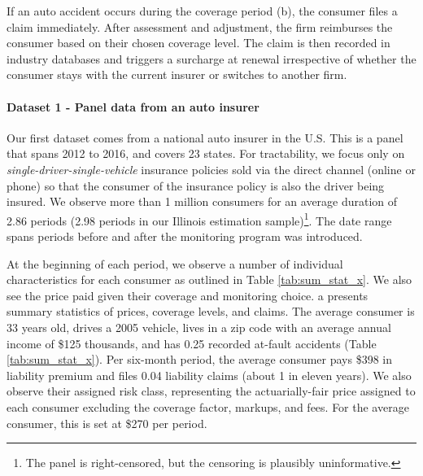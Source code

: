 If an auto accident occurs during the coverage period (b), the consumer files a claim immediately. After assessment and adjustment, the firm reimburses the consumer based on their chosen coverage level. The claim is then recorded in industry databases and triggers a surcharge at renewal irrespective of whether the consumer stays with the current insurer or switches to another firm.

\paragraph{Dataset 1 - Panel data from an auto insurer}

Our first dataset comes from a national auto insurer in the U.S. This is a panel that spans 2012 to 2016, and covers 23 states. For tractability, we focus only on \emph{single-driver-single-vehicle} insurance policies sold via the direct channel (online or phone) so that the consumer of the insurance policy is also the driver being insured. We observe more than 1 million consumers for an average duration of 2.86 periods (2.98 periods in our Illinois estimation sample)\footnote{The panel is right-censored, but the censoring is plausibly uninformative.}. The date range spans periods before and after the monitoring program was introduced.

At the beginning of each period, we observe a number of individual characteristics for each consumer as outlined in Table \ref{tab:sum_stat_x}.
We also see the price paid given their coverage and monitoring choice.
a presents summary statistics of prices, coverage levels, and claims. The average consumer is 33 years old, drives a 2005 vehicle, lives in a zip code with an average annual income of \$125 thousands, and has 0.25 recorded at-fault accidents (Table \ref{tab:sum_stat_x}). Per six-month period, the average consumer pays \$398 in liability premium and files 0.04 liability claims (about 1 in eleven years). We also observe their assigned risk class, representing the actuarially-fair price assigned to each consumer excluding the coverage factor, markups, and fees. For the average consumer, this is set at \$270 per period.


